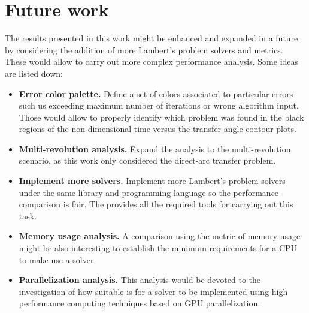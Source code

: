 \section{Future work}

The results presented in this work might be enhanced and expanded in a future by
considering the addition of more Lambert's problem solvers and metrics. These
would allow to carry out more complex performance analysis. Some ideas are
listed down:

\begin{itemize}
	\item \textbf{Error color palette.} Define a set of colors associated to
		particular errors such us exceeding maximum number of iterations
		or wrong algorithm input.  Those would allow to properly
		identify which problem was found in the black regions of the
		non-dimensional time versus the transfer angle contour plots.

	\item \textbf{Multi-revolution analysis.} Expand the analysis to the
		multi-revolution scenario, as this work only considered the
		direct-arc transfer problem.

	\item \textbf{Implement more solvers.} Implement more Lambert's problem
		solvers under the same library and programming language so the
		performance comparison is fair.  The 
		provides all the required tools for carrying out this task.

	\item \textbf{Memory usage analysis.} A comparison using the metric of
		memory usage might be also interesting to establish the minimum
		requirements for a CPU to make use a solver.

	\item \textbf{Parallelization analysis.} This analysis would be devoted
		to the investigation of how suitable is for a solver to be
		implemented using high performance computing techniques based on
		GPU parallelization.
\end{itemize}
